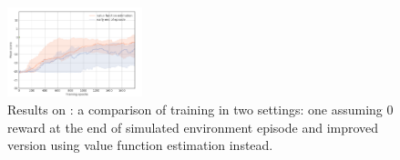 \begin{figure}[H]
\includegraphics[width=0.35\textwidth]{figures/compare1000steps}
\caption{Results on \pong: a comparison of training in two settings: one assuming 0 reward at the end of simulated environment episode and improved version using value function estimation instead.}
\label{fig:ppo_mod}
\end{figure}